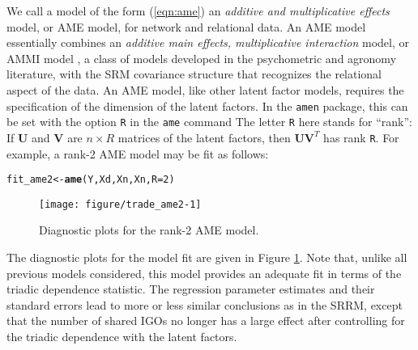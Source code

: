 \documentclass[11pt]{article}\usepackage[]{graphicx}\usepackage[]{color}
\makeatletter
\def\maxwidth{ %
  \ifdim\Gin@nat@width>\linewidth
    \linewidth
  \else
    \Gin@nat@width
  \fi
}
\newcommand{\hlnum}[1]{\textcolor[rgb]{0.686,0.059,0.569}{#1}}%
\newcommand{\hlstd}[1]{\textcolor[rgb]{0.345,0.345,0.345}{#1}}%
\newcommand{\hlkwb}[1]{\textcolor[rgb]{0.69,0.353,0.396}{#1}}%
\newcommand{\hlkwc}[1]{\textcolor[rgb]{0.333,0.667,0.333}{#1}}%
\newcommand{\hlkwd}[1]{\textcolor[rgb]{0.737,0.353,0.396}{\textbf{#1}}}%
\newenvironment{kframe}{%
 \def\at@end@of@kframe{}%
 \ifinner\ifhmode%
  \def\at@end@of@kframe{\end{minipage}}%
  \begin{minipage}{\columnwidth}%
 \fi\fi%
 \def\FrameCommand##1{\hskip\@totalleftmargin \hskip-\fboxsep
 \colorbox{shadecolor}{##1}\hskip-\fboxsep
     \hskip-\linewidth \hskip-\@totalleftmargin \hskip\columnwidth}%
 \MakeFramed {\advance\hsize-\width
   \@totalleftmargin\z@ \linewidth\hsize
   \@setminipage}}%
 {\par\unskip\endMakeFramed%
 \at@end@of@kframe}
\newenvironment{knitrout}{}{} %
\newcommand{\bl}[1]{{\mathbf #1}}
\makeatother
\begin{document}
We call a model of the form (\ref{eqn:ame}) an 
\emph{additive and multiplicative effects} model, or 
AME model, for network and relational data. 
An AME model essentially combines an 
\emph{additive main effects, multiplicative interaction} model,  
or AMMI model \citep{gollob_1968, bradu_gabriel_1974}, a class of 
models developed in the psychometric and agronomy literature, 
with the SRM covariance structure that recognizes the relational 
aspect of the data. 
An AME model, like other latent factor models, requires the specification of the 
dimension of the latent factors. In the {\tt amen} package, this can be 
set with the option {\tt R} in the {\tt ame} command
The letter {\tt R} here stands for ``rank'':  If $\bl U$ and $\bl V$ are $n\times R$ matrices 
of the latent factors, then $\bl U\bl V^T$ has rank {\tt R}. 
For example, 
a rank-2 AME model  may be fit as follows:
\begin{knitrout}\footnotesize
{}\color{fgcolor}\begin{kframe}
\begin{alltt}
\hlstd{fit_ame2}\hlkwb{<-}\hlkwd{ame}\hlstd{(Y,Xd,Xn,Xn,}\hlkwc{R}\hlstd{=}\hlnum{2}\hlstd{)}
\end{alltt}
\end{kframe}\begin{figure}

{\centering \texttt{[image: figure/trade\_ame2-1]} 

}

\caption[Diagnostic plots for the rank-2 AME model]{Diagnostic plots for the rank-2 AME model.}\label{fig:trade_ame2}
\end{figure}


\end{knitrout}
The diagnostic plots for the model fit are given in Figure \ref{fig:trade_ame2}. 
Note that, unlike all previous models considered, this model provides an adequate fit in terms 
of the triadic dependence statistic. 
The regression parameter estimates and their standard errors lead to more or
less similar conclusions as in the SRRM, except that the number of shared IGOs
no longer has a large effect after controlling for the triadic dependence with the
latent factors.
\end{document}
